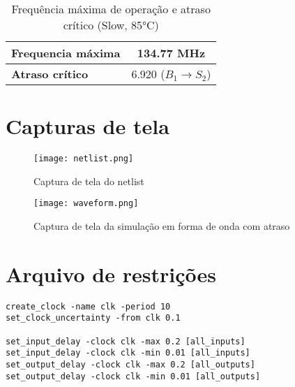 \documentclass[12pt, fleqn]{article}
\begin{document}
\begin{table}[H]
    \centering
    \begin{tabular}{|l | c|}
        \hline
        \textbf{Frequencia máxima} & 134.77 MHz \\
        \hline
        \textbf{Atraso crítico} & 6.920 ($B_1 \to S_2$) \\
        \hline
    \end{tabular}
    \caption{Frequência máxima de operação e atraso crítico (Slow, 85°C)}
\end{table}

\section{Capturas de tela}

\begin{figure}[H]
    \texttt{[image: netlist.png]}
    \caption{Captura de tela do netlist}
\end{figure}

\begin{figure}[H]
    \texttt{[image: waveform.png]}
    \caption{Captura de tela da simulação em forma de onda com atraso}
\end{figure}

\section{Arquivo de restrições}

\begin{lstlisting}[caption=constraints.sdc]
create_clock -name clk -period 10
set_clock_uncertainty -from clk 0.1

set_input_delay -clock clk -max 0.2 [all_inputs]
set_input_delay -clock clk -min 0.01 [all_inputs]
set_output_delay -clock clk -max 0.2 [all_outputs]
set_output_delay -clock clk -min 0.01 [all_outputs]    
\end{lstlisting}
\end{document}
